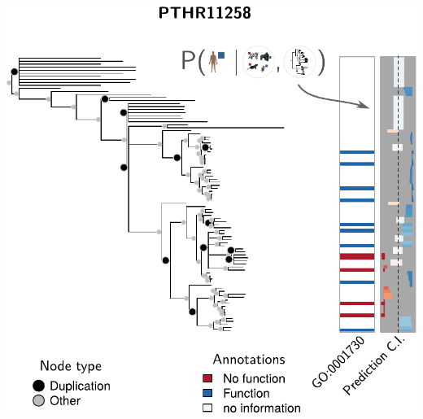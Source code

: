 \documentclass[aspectratio=169, 9pt]{beamer}
\begin{document}
\begin{frame}[t, label=aphylo-good]
\begin{minipage}[m]{.65\linewidth}
{			\includegraphics[width=.85\linewidth, clip, trim={0 0 0 1.5cm}]{example-trees-good1-parts-1b.pdf}
		}
	
		
	\end{minipage}
\end{frame}
\end{document}
